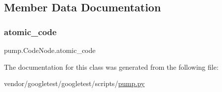 \subsection{Member Data Documentation}
\mbox{\label{classpump_1_1_code_node_ac7251110cc987c709e0e17d95521993e}} 
\subsubsection{\texorpdfstring{atomic\+\_\+code}{atomic\_code}}
{\footnotesize\ttfamily pump.\+Code\+Node.\+atomic\+\_\+code}



The documentation for this class was generated from the following file\+:\begin{DoxyCompactItemize}
\item 
vendor/googletest/googletest/scripts/\hyperlink{pump_8py}{pump.\+py}\end{DoxyCompactItemize}
